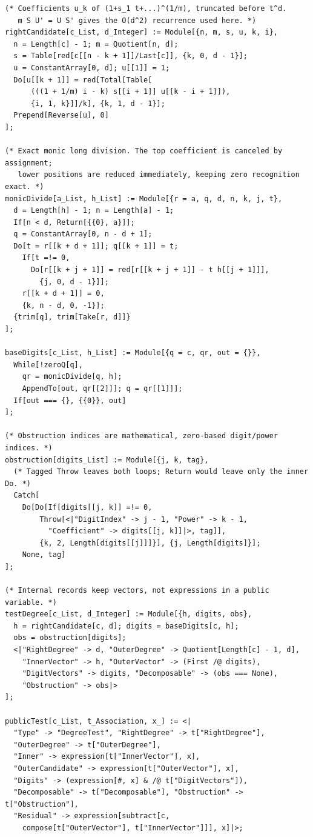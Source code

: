 \documentclass[11pt,a4paper]{article}
\numberwithin{equation}{section}
\theoremstyle{definition}
\theoremstyle{remark}
\begin{document}
\begin{lstlisting}
(* Coefficients u_k of (1+s_1 t+...)^(1/m), truncated before t^d.
   m S U' = U S' gives the O(d^2) recurrence used here. *)
rightCandidate[c_List, d_Integer] := Module[{n, m, s, u, k, i},
  n = Length[c] - 1; m = Quotient[n, d];
  s = Table[red[c[[n - k + 1]]/Last[c]], {k, 0, d - 1}];
  u = ConstantArray[0, d]; u[[1]] = 1;
  Do[u[[k + 1]] = red[Total[Table[
      (((1 + 1/m) i - k) s[[i + 1]] u[[k - i + 1]]),
      {i, 1, k}]]/k], {k, 1, d - 1}];
  Prepend[Reverse[u], 0]
];

(* Exact monic long division. The top coefficient is canceled by assignment;
   lower positions are reduced immediately, keeping zero recognition exact. *)
monicDivide[a_List, h_List] := Module[{r = a, q, d, n, k, j, t},
  d = Length[h] - 1; n = Length[a] - 1;
  If[n < d, Return[{{0}, a}]];
  q = ConstantArray[0, n - d + 1];
  Do[t = r[[k + d + 1]]; q[[k + 1]] = t;
    If[t =!= 0,
      Do[r[[k + j + 1]] = red[r[[k + j + 1]] - t h[[j + 1]]],
        {j, 0, d - 1}]];
    r[[k + d + 1]] = 0,
    {k, n - d, 0, -1}];
  {trim[q], trim[Take[r, d]]}
];

baseDigits[c_List, h_List] := Module[{q = c, qr, out = {}},
  While[!zeroQ[q],
    qr = monicDivide[q, h];
    AppendTo[out, qr[[2]]]; q = qr[[1]]];
  If[out === {}, {{0}}, out]
];

(* Obstruction indices are mathematical, zero-based digit/power indices. *)
obstruction[digits_List] := Module[{j, k, tag},
  (* Tagged Throw leaves both loops; Return would leave only the inner Do. *)
  Catch[
    Do[Do[If[digits[[j, k]] =!= 0,
        Throw[<|"DigitIndex" -> j - 1, "Power" -> k - 1,
          "Coefficient" -> digits[[j, k]]|>, tag]],
        {k, 2, Length[digits[[j]]]}], {j, Length[digits]}];
    None, tag]
];

(* Internal records keep vectors, not expressions in a public variable. *)
testDegree[c_List, d_Integer] := Module[{h, digits, obs},
  h = rightCandidate[c, d]; digits = baseDigits[c, h];
  obs = obstruction[digits];
  <|"RightDegree" -> d, "OuterDegree" -> Quotient[Length[c] - 1, d],
    "InnerVector" -> h, "OuterVector" -> (First /@ digits),
    "DigitVectors" -> digits, "Decomposable" -> (obs === None),
    "Obstruction" -> obs|>
];

publicTest[c_List, t_Association, x_] := <|
  "Type" -> "DegreeTest", "RightDegree" -> t["RightDegree"],
  "OuterDegree" -> t["OuterDegree"],
  "Inner" -> expression[t["InnerVector"], x],
  "OuterCandidate" -> expression[t["OuterVector"], x],
  "Digits" -> (expression[#, x] & /@ t["DigitVectors"]),
  "Decomposable" -> t["Decomposable"], "Obstruction" -> t["Obstruction"],
  "Residual" -> expression[subtract[c,
    compose[t["OuterVector"], t["InnerVector"]]], x]|>;


\end{lstlisting}
\end{document}
